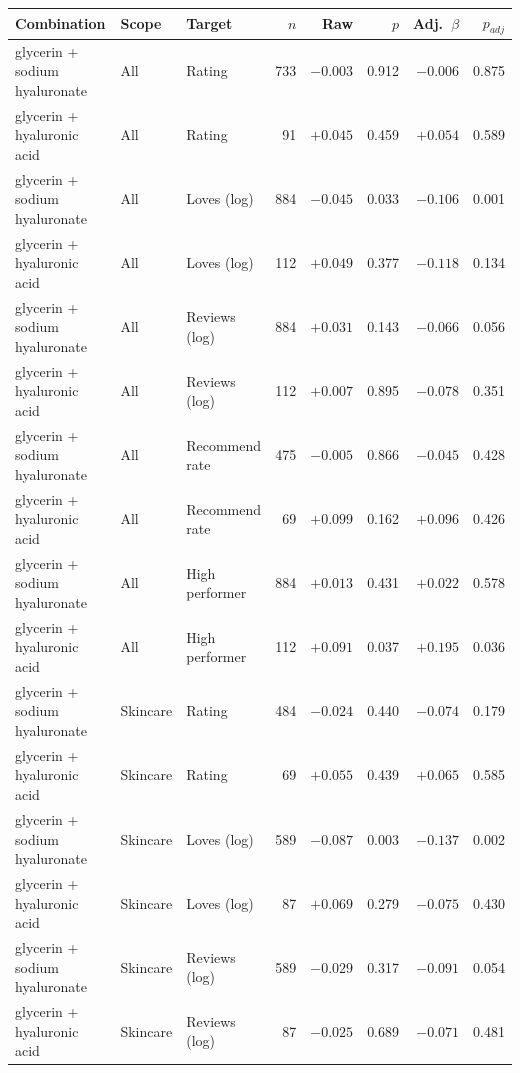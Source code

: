 \begin{table}[htbp]
\centering
\small
\begin{tabular}{|l|l|l|r|r|r|r|r|}
\hline
\rowcolor{headfill} \textbf{Combination} & \textbf{Scope} & \textbf{Target} & \textbf{$n$} & \textbf{Raw} & \textbf{$p$} & \textbf{Adj.\ $\beta$} & \textbf{$p_{adj}$} \\
\hline
glycerin + sodium hyaluronate & All & Rating & 733 & $-0.003$ & 0.912 & $-0.006$ & 0.875 \\
\hline
glycerin + hyaluronic acid & All & Rating & 91 & $+0.045$ & 0.459 & $+0.054$ & 0.589 \\
\hline
glycerin + sodium hyaluronate & All & Loves (log) & 884 & $-0.045$ & 0.033 & $-0.106$ & 0.001 \\
\hline
glycerin + hyaluronic acid & All & Loves (log) & 112 & $+0.049$ & 0.377 & $-0.118$ & 0.134 \\
\hline
glycerin + sodium hyaluronate & All & Reviews (log) & 884 & $+0.031$ & 0.143 & $-0.066$ & 0.056 \\
\hline
glycerin + hyaluronic acid & All & Reviews (log) & 112 & $+0.007$ & 0.895 & $-0.078$ & 0.351 \\
\hline
glycerin + sodium hyaluronate & All & Recommend rate & 475 & $-0.005$ & 0.866 & $-0.045$ & 0.428 \\
\hline
glycerin + hyaluronic acid & All & Recommend rate & 69 & $+0.099$ & 0.162 & $+0.096$ & 0.426 \\
\hline
glycerin + sodium hyaluronate & All & High performer & 884 & $+0.013$ & 0.431 & $+0.022$ & 0.578 \\
\hline
glycerin + hyaluronic acid & All & High performer & 112 & $+0.091$ & 0.037 & $+0.195$ & 0.036 \\
\hline
glycerin + sodium hyaluronate & Skincare & Rating & 484 & $-0.024$ & 0.440 & $-0.074$ & 0.179 \\
\hline
glycerin + hyaluronic acid & Skincare & Rating & 69 & $+0.055$ & 0.439 & $+0.065$ & 0.585 \\
\hline
glycerin + sodium hyaluronate & Skincare & Loves (log) & 589 & $-0.087$ & 0.003 & $-0.137$ & 0.002 \\
\hline
glycerin + hyaluronic acid & Skincare & Loves (log) & 87 & $+0.069$ & 0.279 & $-0.075$ & 0.430 \\
\hline
glycerin + sodium hyaluronate & Skincare & Reviews (log) & 589 & $-0.029$ & 0.317 & $-0.091$ & 0.054 \\
\hline
glycerin + hyaluronic acid & Skincare & Reviews (log) & 87 & $-0.025$ & 0.689 & $-0.071$ & 0.481 \\

\end{tabular}
\end{table}
